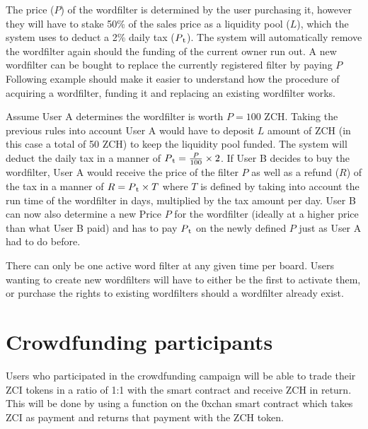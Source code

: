 \documentclass[a4paper]{article}
\newcommand{\projectname}{0xchan}
\begin{document}
The price ($P$) of the wordfilter is determined by the user purchasing it, however they will have to stake 50\% of the sales price as a liquidity pool ($L$), which the system uses to deduct a 2\% daily tax ($P\textsubscript{t}$). The system will automatically remove the wordfilter again should the funding of the current owner run out. A new wordfilter can be bought to replace the currently registered filter by paying $P$ Following example should make it easier to understand how the procedure of acquiring a wordfilter, funding it and replacing an existing wordfilter works.

Assume User A determines the wordfilter is worth $P=100$ ZCH. Taking the previous rules into account User A would have to deposit $L$ amount of ZCH (in this case a total of 50 ZCH) to keep the liquidity pool funded. The system will deduct the daily tax in a manner of $P\textsubscript{t}=\frac{P}{100} \times 2$. If User B decides to buy the wordfilter, User A would receive the price of the filter $P$ as well as a refund ($R$) of the tax in a manner of $R=P\textsubscript{t} \times T$ where $T$ is defined by taking into account the run time of the wordfilter in days, multiplied by the tax amount per day. User B can now also determine a new Price $P$ for the wordfilter (ideally at a higher price than what User B paid) and has to pay $P\textsubscript{t}$ on the newly defined $P$ just as User A had to do before.

There can only be one active word filter at any given time per board. Users wanting to create new wordfilters will have to either be the first to activate them, or purchase the rights to existing wordfilters should a wordfilter already exist.

\section{Crowdfunding participants}
Users who participated in the crowdfunding campaign will be able to trade their ZCI tokens in a ratio of 1:1 with the smart contract and receive ZCH in return. This will be done by using a function on the \projectname{} smart contract which takes ZCI as payment and returns that payment with the ZCH token.

\pagebreak
\end{document}
